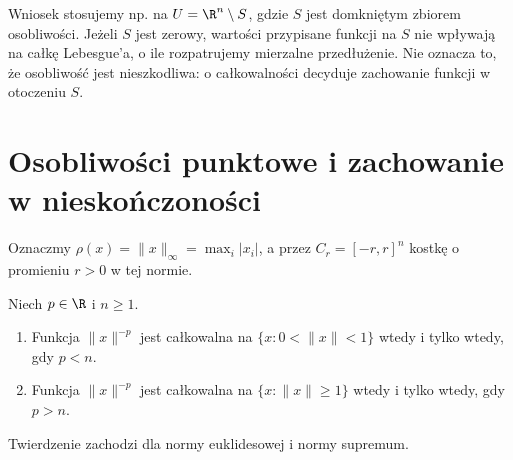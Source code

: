 Wniosek stosujemy np. na $U=\R^n\setminus S$,
gdzie $S$ jest domkniętym zbiorem osobliwości.
Jeżeli $S$ jest zerowy, wartości przypisane
funkcji na $S$ nie wpływają na całkę Lebesgue'a,
o ile rozpatrujemy mierzalne przedłużenie.
Nie oznacza to, że osobliwość jest nieszkodliwa:
o całkowalności decyduje zachowanie funkcji
w otoczeniu $S$.

\section{Osobliwości punktowe i zachowanie w nieskończoności}

Oznaczmy $\rho(x)=\|x\|_\infty=\max_i|x_i|$,
a przez $C_r=[-r,r]^n$ kostkę o promieniu $r>0$
w tej normie.

\begin{twierdzenie}
\label{ma2:thm:improper-power-test}
Niech $p\in\R$ i $n\ge1$.
\begin{enumerate}[label=(\roman*)]
\item Funkcja $\|x\|^{-p}$ jest całkowalna
na $\{x:0<\|x\|<1\}$ wtedy i tylko wtedy,
gdy $p<n$.
\item Funkcja $\|x\|^{-p}$ jest całkowalna
na $\{x:\|x\|\ge1\}$ wtedy i tylko wtedy,
gdy $p>n$.
\end{enumerate}
Twierdzenie zachodzi dla normy euklidesowej
i normy supremum.
\end{twierdzenie}
